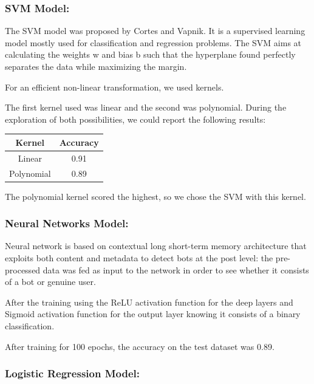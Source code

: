 \documentclass{article}
\begin{document}
    \subsubsection{SVM Model:}
    
    The SVM model was proposed by Cortes and Vapnik. It is a supervised learning model mostly used for classification and regression problems. The SVM aims at calculating the weights w and bias b such that the hyperplane found perfectly separates the data while maximizing the margin.
    
    For an efficient non-linear transformation, we used kernels.
    
    The first kernel used was linear and the second was polynomial. During the exploration of both possibilities, we could report the following results:
    
    \begin{center}
    \begin{tabular}{||c c||} 
     \hline
     Kernel & Accuracy    \\ [0.5ex] 
     \hline\hline
     Linear & 0.91  \\ 
     \hline
     Polynomial & 0.89  \\
     \hline
    \end{tabular}
    \end{center}
    
    The polynomial kernel scored the highest, so we chose the SVM with this kernel.
       

    \subsubsection{Neural Networks Model:}
    
    Neural network is based on contextual long short-term memory architecture that exploits both content and metadata to detect bots at the post level: the pre-processed data was fed as  input to the network in order to see whether it consists of a bot or genuine user. 
    
    After the training using the ReLU activation function for the deep layers and Sigmoid activation function for the output layer knowing it consists of a binary classification.
    
    After training for 100 epochs, the accuracy on the test dataset was 0.89.
    
    \subsubsection{Logistic Regression Model:}
    
\end{document}
